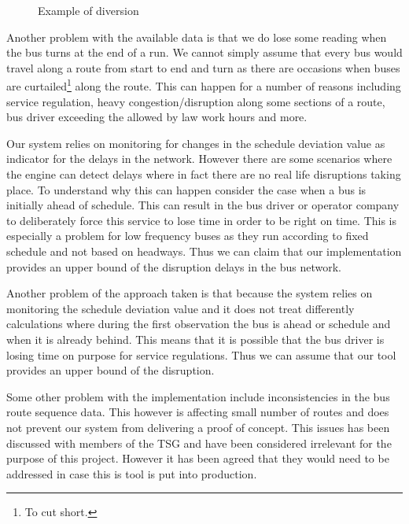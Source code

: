 \begin{figure}[ht]
	\caption{Example of diversion}
	\label{fig:diversion}
\end{figure}

Another problem with the available data is that we do lose some reading when the bus turns at the end of a run. We cannot simply assume that every bus would travel along a route from start to end and turn as there are occasions when buses are curtailed\footnote{To cut short.} along the route. This can happen for a number of reasons including service regulation, heavy congestion/disruption along some sections of a route, bus driver exceeding the allowed by law work hours and more.

Our system relies on monitoring for changes in the schedule deviation value as indicator for the delays in the network. However there are some scenarios where the engine can detect delays where in fact there are no real life disruptions taking place. To understand why this can happen consider the case when a bus is initially ahead of schedule. This can result in the bus driver or operator company to deliberately force this service to lose time in order to be right on time. This is especially a problem for low frequency buses as they run according to fixed schedule and not based on headways. Thus we can claim that our implementation provides an upper bound of the disruption delays in the bus network.

Another problem of the approach taken is that because the system relies on monitoring the schedule deviation value and it does not treat differently calculations where during the first observation the bus is ahead or schedule and when it is already behind. This means that it is possible that the bus driver is losing time on purpose for service regulations. Thus we can assume that our tool provides an upper bound of the disruption.

Some other problem with the implementation include inconsistencies in the bus route sequence data. This however is affecting small number of routes and does not prevent our system from delivering a proof of concept. This issues has been discussed with members of the TSG and have been considered irrelevant for the purpose of this project. However it has been agreed that they would need to be addressed in case this is tool is put into production. 

